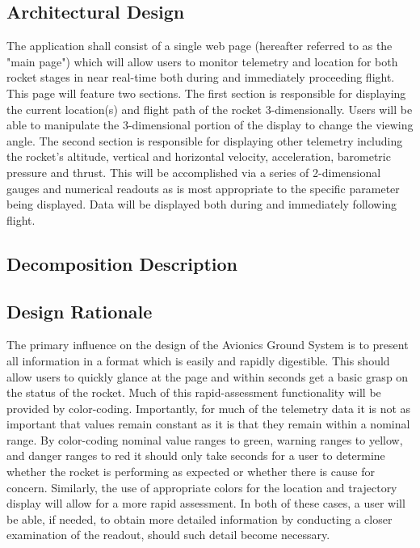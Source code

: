 \documentclass[journal,10pt,onecolumn,compsoc]{IEEEtran}
\begin{document}
	\subsection{Architectural Design}


		\noindent The application shall consist of a single web page (hereafter referred to as the "main page") which will allow users to monitor telemetry and location for both rocket stages in near real-time both during and immediately proceeding flight.
		This page will feature two sections.
		The first section is responsible for displaying the current location(s) and flight path of the rocket 3-dimensionally.
		Users will be able to manipulate the 3-dimensional portion of the display to change the viewing angle.
		The second section is responsible for displaying other telemetry including the rocket’s altitude, vertical and horizontal velocity, acceleration, barometric pressure and thrust.
		This will be accomplished via a series of 2-dimensional gauges and numerical readouts as is most appropriate to the specific parameter being displayed.
		Data will be displayed both during and immediately following flight.


	\subsection{Decomposition Description}


	\subsection{Design Rationale}
		\noindent The primary influence on the design of the Avionics Ground System is to present all information in a format which is easily and rapidly digestible.
		This should allow users to quickly glance at the page and within seconds get a basic grasp on the status of the rocket.
		Much of this rapid-assessment functionality will be provided by color-coding.
		Importantly, for much of the telemetry data it is not as important that values remain constant as it is that they remain within a nominal range. 
		By color-coding nominal value ranges to green, warning ranges to yellow, and danger ranges to red it should only take seconds for a user to determine whether the rocket is performing as expected or whether there is cause for concern.
		Similarly, the use of appropriate colors for the location and trajectory display will allow for a more rapid assessment.
		In both of these cases, a user will be able, if needed, to obtain more detailed information by conducting a closer examination of the readout, should such detail become necessary.
\end{document}
